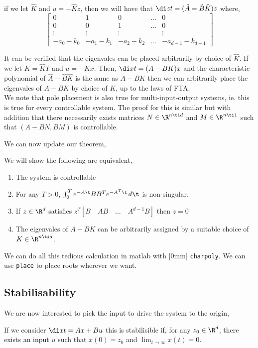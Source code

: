 if we let $\hat K$ and $u = -\hat K z$, then we will have that $\di z t = (\hat A = \hat B \hat K)z$ where,
$$ \begin{bmatrix}
  0 & 1 & 0 & \dots & 0 \\
  0 & 0 & 1 & \dots & 0 \\
  \vdots & \vdots & \vdots && \vdots\\
  -a_0 - k_0 & -a_1-k_1 & -a_2-k_2 & \dots & - a_{d-1} - k_{d-1}
\end{bmatrix} $$

It can be verified that the eigenvales can be placed arbitrarily by choice of $\hat K$. If we let $K = \hat K T$ and $u = - Kx$. Then, $\di x t = (A - BK)x$ and the characteristic polynomial of $\hat A - \hat B\hat K$ is the same as $A - BK$ then we can arbitrarily place the eigenvales of $A - BK$ by choice of $K$, up to the laws of FTA.\\

We note that pole placement is also true for multi-input-output systems, ie. this is true for every controllable system. The proof for this is similar but with addition that there necessarily exists matrices $N\in \R^{n\ti d}$ and $M \in \R^{n\ti 1}$ such that $(A - BN, BM)$ is controllable.

We can now update our theorem,
\begin{nthm}
  We will show the following are equivalent,
  \begin{enumerate}
    \item The system is controllable
    \item For any $T > 0$, $\int_0^T e^{-A\t}BB^T e^{-A^T\t}\,d\t$ is non-singular.
    \item If $z \in \R^d$ satisfies $z^T [B \quad AB \quad \dots \quad A^{d-1}B]$ then $z = 0$
    \item The eigenvales of $A - BK$ can be arbitrarily assigned by a suitable choice of $K \in \R^{n \ti d}$.
  \end{enumerate}
\end{nthm}

We can do all this tedious calculation in matlab with [0mm] \texttt{charpoly}. We can use \texttt{place} to place roots wherever we want.

\subsection{Stabilisability}
We are now interested to pick the input to drive the system to the origin,
\begin{ndefi}[Stabilisability]
  If we consider $\di x t = Ax + Bu$ this is stabilisible if, for any $z_0 \in \R^d$, there exists an input $u$ such that $x(0) = z_0$ and $\lim_{t\to\infty} x(t) = 0$.
\end{ndefi}

